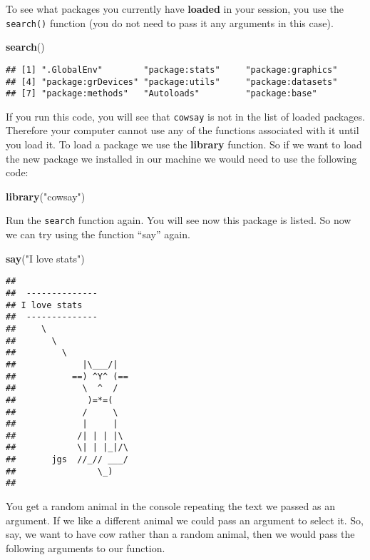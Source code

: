 \documentclass[
]{book}
\newenvironment{Shaded}{\begin{snugshade}}{\end{snugshade}}
\newcommand{\FunctionTok}[1]{\textcolor[rgb]{0.13,0.29,0.53}{\textbf{#1}}}
\newcommand{\NormalTok}[1]{#1}
\newcommand{\StringTok}[1]{\textcolor[rgb]{0.31,0.60,0.02}{#1}}
\begin{document}
To see what packages you currently have \textbf{loaded} in your session, you use the \texttt{search()} function (you do not need to pass it any arguments in this case).

\begin{Shaded}
\begin{Highlighting}[]
\FunctionTok{search}\NormalTok{()}
\end{Highlighting}
\end{Shaded}

\begin{verbatim}
## [1] ".GlobalEnv"        "package:stats"     "package:graphics" 
## [4] "package:grDevices" "package:utils"     "package:datasets" 
## [7] "package:methods"   "Autoloads"         "package:base"
\end{verbatim}

If you run this code, you will see that \texttt{cowsay} is not in the list of loaded packages. Therefore your computer cannot use any of the functions associated with it until you load it. To load a package we use the \textbf{library} function. So if we want to load the new package we installed in our machine we would need to use the following code:

\begin{Shaded}
\begin{Highlighting}[]
\FunctionTok{library}\NormalTok{(}\StringTok{"cowsay"}\NormalTok{)}
\end{Highlighting}
\end{Shaded}

Run the \texttt{search} function again. You will see now this package is listed. So now we can try using the function ``say'' again.

\begin{Shaded}
\begin{Highlighting}[]
\FunctionTok{say}\NormalTok{(}\StringTok{"I love stats"}\NormalTok{)}
\end{Highlighting}
\end{Shaded}

\begin{verbatim}
## 
##  -------------- 
## I love stats 
##  --------------
##     \
##       \
##         \
##             |\___/|
##           ==) ^Y^ (==
##             \  ^  /
##              )=*=(
##             /     \
##             |     |
##            /| | | |\
##            \| | |_|/\
##       jgs  //_// ___/
##                \_)
## 
\end{verbatim}

You get a random animal in the console repeating the text we passed as an argument. If we like a different animal we could pass an argument to select it. So, say, we want to have cow rather than a random animal, then we would pass the following arguments to our function.
\end{document}
